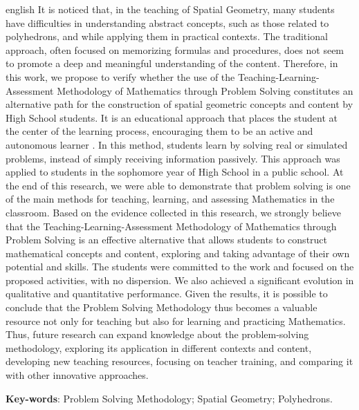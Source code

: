 \begin{resumo}[Abstract]
\begin{otherlanguage*}{english}
		It is noticed that, in the teaching of Spatial Geometry, many students have difficulties in understanding abstract concepts, such as those related to polyhedrons, and while applying them in practical contexts. The traditional approach, often focused on memorizing formulas and procedures, does not seem to promote a deep and meaningful understanding of the content. Therefore, in this work, we propose to verify whether the use of the Teaching-Learning-Assessment Methodology of Mathematics through Problem Solving \cite{resolucaoDeProblemas2019, polya1978} constitutes an alternative path for the construction of spatial geometric concepts and content by High School students. It is an educational approach that places the student at the center of the learning process, encouraging them to be an active and autonomous learner \cite{polya1978}. In this method, students learn by solving real or simulated problems, instead of simply receiving information passively. This approach was applied to students in the sophomore year of High School in a public school. At the end of this research, we were able to demonstrate that problem solving is one of the main methods for teaching, learning, and assessing Mathematics in the classroom. Based on the evidence collected in this research, we strongly believe that the Teaching-Learning-Assessment Methodology of Mathematics through Problem Solving is an effective alternative that allows students to construct mathematical concepts and content, exploring and taking advantage of their own potential and skills. The students were committed to the work and focused on the proposed activities, with no dispersion. We also achieved a significant evolution in qualitative and quantitative performance. Given the results, it is possible to conclude that the Problem Solving Methodology thus becomes a valuable resource not only for teaching but also for learning and practicing Mathematics. Thus, future research can expand knowledge about the problem-solving methodology, exploring its application in different contexts and content, developing new teaching resources, focusing on teacher training, and comparing it with other innovative approaches.

		\vspace{\onelineskip}

		\noindent
		\textbf{Key-words}: Problem Solving Methodology; Spatial Geometry; Polyhedrons.
	\end{otherlanguage*}
\end{resumo}
